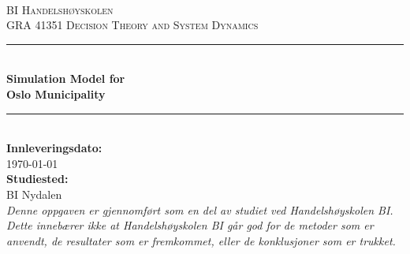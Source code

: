 \begin{titlepage}

\newcommand{\HRule}{\color{rockwoolcolor}\rule{\linewidth}{0.75mm}\color{black}} %

\center %
 
\ \\[1.5cm]
\textsc{\LARGE BI Handelshøyskolen}\\[1.5cm] %
\textsc{\Large GRA 41351 Decision Theory and System Dynamics}\\[2.5cm] %



\HRule \\[0.4cm]
{ \huge \bfseries Simulation Model for \\[0.5cm] Oslo Municipality}\\[0.4cm] %
\HRule \\[2.5cm]
 

{\large \textbf{Innleveringsdato:}\\  \today}\\[1cm] %
{\large \textbf{Studiested:}\\  BI Nydalen}\\[3cm] %
 

\textit{Denne oppgaven er gjennomført som en del av studiet ved Handelshøyskolen BI. Dette innebærer
ikke at Handelshøyskolen BI går god for de metoder som er anvendt, de resultater som er
fremkommet, eller de konklusjoner som er trukket.}
\vfill %

\end{titlepage}